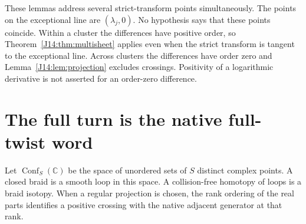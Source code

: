 \documentclass[11pt,oneside]{report}
\theoremstyle{definition}
\numberwithin{equation}{section}
\newcommand{\C}{\mathbb C}
\newcommand{\Conf}{\operatorname{Conf}}
\begin{document}
These lemmas address several strict-transform points simultaneously.
The points on the exceptional line are $(\lambda_j,0)$. No hypothesis says
that these points coincide. Within a cluster the differences have positive
order, so Theorem~\ref{J14:thm:multisheet} applies even when the strict transform
is tangent to the exceptional line. Across clusters the differences have
order zero and Lemma~\ref{J14:lem:projection} excludes crossings. Positivity of a
logarithmic derivative is not asserted for an order-zero difference.

\section{The full turn is the native full-twist word}

Let $\Conf_S(\C)$ be the space of unordered sets of $S$ distinct complex
points. A closed braid is a smooth loop in this space. A collision-free
homotopy of loops is a braid isotopy. When a regular projection is chosen,
the rank ordering of the real parts identifies a positive crossing with the
native adjacent generator at that rank.
\end{document}
